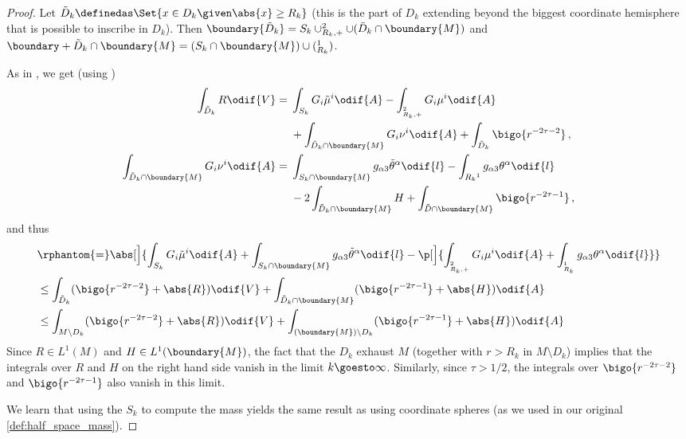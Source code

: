 \documentclass[titlepage,numbers=noenddot,oneside,%
cleardoublepage=empty,paper=a4,fontsize=11pt,%
english,%
]{scrartcl}
\newcommand*{\mathcomma}{\,,}
\let\sphere\relax
\newcommand{\sphere}{\mathbb{S}}
\begin{document}
\begin{proof}
    Let \( \tilde{D}_k\definedas \Set{x\in D_k\given \abs{x}\geq R_k} \) (this is the part of \( D_k \) extending beyond the biggest coordinate hemisphere that is possible to inscribe in \( D_k \)). Then \( \boundary{\tilde{D}_k}=S_k \cup \sphere^2_{R_k,+}\cup (\tilde{D}_k\cap \boundary{M}) \) and \( \boundary+{\tilde{D}_k\cap \boundary{M}}=(S_k\cap \boundary{M})\cup (\sphere^1_{R_k}) \).



    As in \cite[Proposition 3.7]{almarazPositiveMassTheorem2016}, we get (using \cite[Equations 3.16 and 3.17]{almarazPositiveMassTheorem2016})
    \begin{align*}
        \int_{\tilde{D}_k}{R}\odif{V}&=\begin{aligned}[t]
            &\int_{S_k}G_i\tilde{\mu}^i \odif{A}-\int_{\sphere^2_{R_k,+}}G_i\mu^i\odif{A}\\
            &+\int_{\tilde{D}_k \cap \boundary{M}}G_i\nu^i \odif{A}+\int_{\tilde{D}_k}\bigo{r^{-2\tau-2}}\mathcomma
        \end{aligned}\\
        \int_{\tilde{D}_k\cap \boundary{M}}G_i \nu^i\odif{A}&=\begin{aligned}[t]
            &\int_{S_k\cap \boundary{M}}g_{\alpha 3}\tilde{\theta}^\alpha\odif{l}-\int_{\sphere{R_k}^1}g_{\alpha3}\theta^\alpha\odif{l}\\
            &-2\int_{\tilde{D}_k\cap \boundary{M}}H+\int_{\tilde{D}\cap \boundary{M}}\bigo{r^{-2\tau-1}}\mathcomma
        \end{aligned}
    \end{align*}
    and thus
    \begin{equation*}
        \begin{aligned}[t]
        &\rphantom{=}\abs[\Big]{\int_{S_k}G_i \tilde{\mu}^i \odif{A}+\int_{S_k\cap \boundary{M}}g_{\alpha 3}\tilde{\theta}^\alpha\odif{l}-\p[\Big]{\int_{\sphere^2_{R_k,+}}G_i\mu^i \odif{A}+\int_{\sphere^1_{R_k}}g_{\alpha 3}\theta^\alpha\odif{l}}}\\
        &\leq \int_{\tilde{D}_k}(\bigo{r^{-2\tau-2}}+\abs{R})\odif{V}+\int_{\tilde{D}_k\cap \boundary{M}}(\bigo{r^{-2\tau-1}}+\abs{H})\odif{A}\\
        &\leq \int_{M\setminus D_k}(\bigo{r^{-2\tau-2}}+\abs{R})\odif{V}+\int_{(\boundary{M})\setminus D_k}(\bigo{r^{-2\tau-1}}+\abs{H})\odif{A}\\
        \end{aligned}
    \end{equation*}
    Since \( R\in L^1(M) \) and \( H\in L^1(\boundary{M}) \), the fact that the \( D_k \) exhaust \( M \) (together with \( r>R_k \) in \( M\setminus D_k \)) implies that the integrals over \( R \) and \( H \) on the right hand side vanish in the limit \( k\goesto \infty \). Similarly, since \( \tau>1/2 \), the integrals over \( \bigo{r^{-2\tau-2}} \) and \( \bigo{r^{-2\tau-1}} \) also vanish in this limit. 
     
    We learn that using the \( S_k \) to compute the mass yields the same result as using coordinate spheres (as we used in our original \cref{def:half_space_mass}).
\end{proof}
\end{document}

